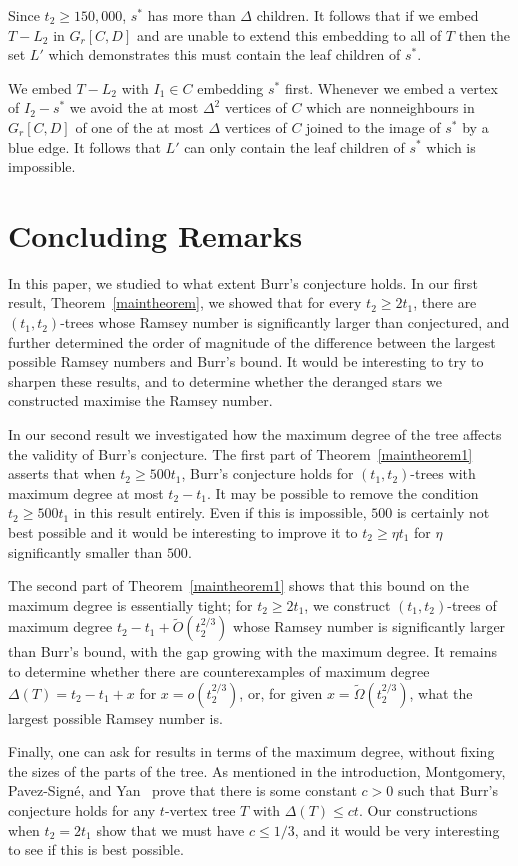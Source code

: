 \documentclass[11pt]{article}
\begin{document}
Since $t_2 \ge 150,000$, $s^*$ has more than $\Delta$ children. It follows that if we embed $T-L_2$ in $G_r[C,D]$ and
are unable to extend this embedding to all of $T$  then the set $L'$ which demonstrates this must contain the leaf children of $s^*$. 

We embed $T-L_2$  with $I_1 \in C$ embedding $s^*$ first. 
Whenever we embed a vertex of $I_2-s^*$ we avoid the at most $\Delta^2$  vertices of $C$  which are nonneighbours in  $G_r[C,D]$ of
one of the at most $\Delta$ vertices of $C$ joined to the image of $s^*$ by a blue edge. It follows that $L'$ can only contain the leaf children  of $s^*$ which is impossible. 

 
 

\section{Concluding Remarks}
\label{seccr}

In this paper, we studied to what extent Burr's conjecture holds. In our first result, Theorem~\ref{maintheorem}, we showed that for every $t_2 \ge 2t_1$, there are $(t_1, t_2)$-trees whose Ramsey number is significantly larger than conjectured, and further determined the order of magnitude of the difference between the largest possible Ramsey numbers and Burr's bound. It would be interesting to try to sharpen these results, and to determine whether the deranged stars we constructed maximise the Ramsey number.

In our second result we investigated how the maximum degree of the tree affects the validity of Burr's conjecture. The first part of Theorem~\ref{maintheorem1} asserts that when $t_2 \ge 500t_1$, Burr's conjecture holds for $(t_1,t_2)$-trees with maximum degree at most $t_2-t_1$. 
It  may be possible  to remove  the condition $t_2 \ge 500 t_1$ in this result  entirely. Even if this is impossible, $500$ is certainly  not best possible and it would be interesting to improve it to $t_2 \ge \eta t_1$ for $\eta$ significantly smaller than $500$.

The second part of Theorem~\ref{maintheorem1} shows that this bound on the maximum degree is essentially tight; for $t_2 \ge 2 t_1$, we construct $(t_1, t_2)$-trees of maximum degree $t_2 - t_1 + \tilde{O} \left( t_2^{2/3} \right)$ whose Ramsey number is significantly larger than Burr's bound, with the gap growing with the maximum degree. It remains to determine whether there are counterexamples of maximum degree $\Delta(T) = t_2 - t_1 + x$ for $x = o \left( t_2^{2/3} \right)$, or, for given $x = \tilde{\Omega}  \left( t_2^{2/3} \right)$, what the largest possible Ramsey number is.

Finally, one can ask for results in terms of the maximum degree, without fixing the sizes of the parts of the tree. As mentioned in the introduction, Montgomery, Pavez-Sign\'e, and Yan~\cite{MPY} prove that there is some constant $c > 0$ such that Burr's conjecture holds for any $t$-vertex tree $T$ with $\Delta(T) \le ct$. Our constructions when $t_2 = 2t_1$ show that we must have $c \le 1/3$, and it would be very interesting to see if this is best possible.




\end{document}
